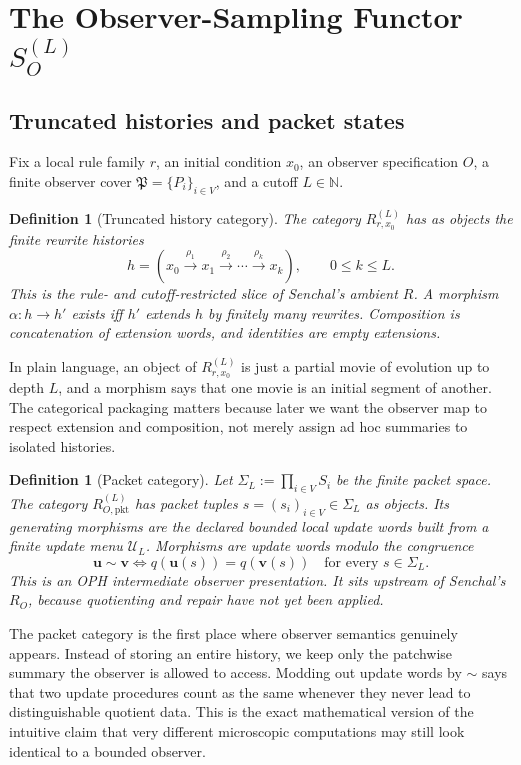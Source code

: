 \documentclass[11pt]{article}
\newtheorem{definition}[theorem]{Definition}
\theoremstyle{remark}
\theoremstyle{plain}
\begin{document}
\section{The Observer-Sampling Functor \(S_O^{(L)}\)}
\label{sec:functor}

\subsection{Truncated histories and packet states}

Fix a local rule family \(r\), an initial condition \(x_0\), an observer specification \(O\), a finite observer cover \(\mathfrak P=\{P_i\}_{i\in V}\), and a cutoff \(L\in\mathbb N\).

\begin{definition}[Truncated history category]
The category \(R^{(L)}_{r,x_0}\) has as objects the finite rewrite histories
\[
h=(x_0\xrightarrow{\rho_1}x_1\xrightarrow{\rho_2}\cdots\xrightarrow{\rho_k}x_k),
\qquad
0\le k\le L.
\]
This is the rule- and cutoff-restricted slice of Senchal's ambient \(R\).
A morphism \(\alpha:h\to h'\) exists iff \(h'\) extends \(h\) by finitely many rewrites. Composition is concatenation of extension words, and identities are empty extensions.
\end{definition}

In plain language, an object of \(R^{(L)}_{r,x_0}\) is just a partial movie of evolution up to depth \(L\), and a morphism says that one movie is an initial segment of another. The categorical packaging matters because later we want the observer map to respect extension and composition, not merely assign ad hoc summaries to isolated histories.

\begin{definition}[Packet category]
Let \(\Sigma_L:=\prod_{i\in V}S_i\) be the finite packet space. The category \(R^{(L)}_{O,\mathrm{pkt}}\) has packet tuples \(s=(s_i)_{i\in V}\in\Sigma_L\) as objects. Its generating morphisms are the declared bounded local update words built from a finite update menu \(\mathcal U_L\). Morphisms are update words modulo the congruence
\[
\mathbf u\sim \mathbf v
\iff
q(\mathbf u(s))=q(\mathbf v(s))
\quad
\text{for every } s\in\Sigma_L.
\]
This is an OPH intermediate observer presentation. It sits upstream of Senchal's \(R_O\), because quotienting and repair have not yet been applied.
\end{definition}

The packet category is the first place where observer semantics genuinely appears. Instead of storing an entire history, we keep only the patchwise summary the observer is allowed to access. Modding out update words by \(\sim\) says that two update procedures count as the same whenever they never lead to distinguishable quotient data. This is the exact mathematical version of the intuitive claim that very different microscopic computations may still look identical to a bounded observer.
\end{document}
